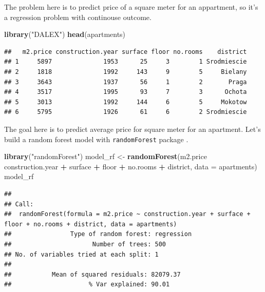 \documentclass[]{krantz}
\newenvironment{Shaded}{\begin{snugshade}}{\end{snugshade}}
\newcommand{\DataTypeTok}[1]{\textcolor[rgb]{0.13,0.29,0.53}{#1}}
\newcommand{\KeywordTok}[1]{\textcolor[rgb]{0.13,0.29,0.53}{\textbf{#1}}}
\newcommand{\NormalTok}[1]{#1}
\newcommand{\OperatorTok}[1]{\textcolor[rgb]{0.81,0.36,0.00}{\textbf{#1}}}
\newcommand{\StringTok}[1]{\textcolor[rgb]{0.31,0.60,0.02}{#1}}
\theoremstyle{definition}
\theoremstyle{definition}
\theoremstyle{definition}
\theoremstyle{remark}
\begin{document}
The problem here is to predict price of a square meter for an
appartment, so it's a regression problem with continouse outcome.

\begin{Shaded}
\begin{Highlighting}[]
\KeywordTok{library}\NormalTok{(}\StringTok{"DALEX"}\NormalTok{)}
\KeywordTok{head}\NormalTok{(apartments)}
\end{Highlighting}
\end{Shaded}

\begin{verbatim}
##   m2.price construction.year surface floor no.rooms    district
## 1     5897              1953      25     3        1 Srodmiescie
## 2     1818              1992     143     9        5     Bielany
## 3     3643              1937      56     1        2       Praga
## 4     3517              1995      93     7        3      Ochota
## 5     3013              1992     144     6        5     Mokotow
## 6     5795              1926      61     6        2 Srodmiescie
\end{verbatim}

The goal here is to predict average price for square meter for an
apartment. Let's build a random forest model with \texttt{randomForest}
package \citep{R-randomForest}.

\begin{Shaded}
\begin{Highlighting}[]
\KeywordTok{library}\NormalTok{(}\StringTok{"randomForest"}\NormalTok{)}
\NormalTok{model_rf <-}\StringTok{ }\KeywordTok{randomForest}\NormalTok{(m2.price }\OperatorTok{~}\StringTok{ }\NormalTok{construction.year }\OperatorTok{+}\StringTok{ }\NormalTok{surface }\OperatorTok{+}\StringTok{ }\NormalTok{floor }\OperatorTok{+}\StringTok{ }\NormalTok{no.rooms }\OperatorTok{+}\StringTok{ }\NormalTok{district, }\DataTypeTok{data =}\NormalTok{ apartments)}
\NormalTok{model_rf}
\end{Highlighting}
\end{Shaded}

\begin{verbatim}
## 
## Call:
##  randomForest(formula = m2.price ~ construction.year + surface +      floor + no.rooms + district, data = apartments) 
##                Type of random forest: regression
##                      Number of trees: 500
## No. of variables tried at each split: 1
## 
##           Mean of squared residuals: 82079.37
##                     % Var explained: 90.01
\end{verbatim}
\end{document}
